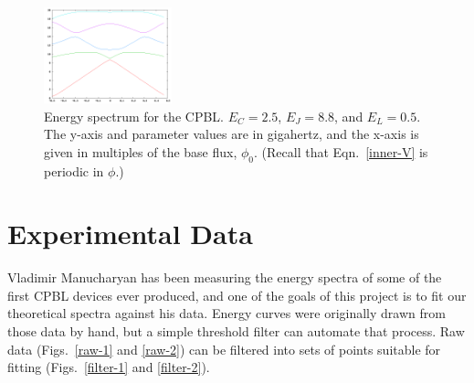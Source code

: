 \documentclass[twocolumn]{revtex4}
\newcommand{\figwidth}{0.33\textwidth}
\begin{document}
\begin{figure} 
\includegraphics[width=\figwidth]{CPBL-theory.png}
\caption{ Energy spectrum for the CPBL. $E_C=2.5$, $E_J=8.8$, and
  $E_L=0.5$. The y-axis and parameter values are in gigahertz, and the
  x-axis is given in multiples of the base flux, $\phi_0$. (Recall
  that Eqn.~\eqref{inner-V} is periodic in $\phi$.)}
\label{cpbl-theory}
\end{figure}

\section{Experimental Data}
Vladimir Manucharyan has been measuring the energy spectra of some of the
first CPBL devices ever produced, and one of the goals of this project
is to fit our theoretical spectra against his data. Energy curves were
originally drawn from those data by hand, but a simple threshold
filter can automate that process. Raw data (Figs.~\ref{raw-1} and
\ref{raw-2}) can be filtered into sets of points suitable for fitting
(Figs.~\ref{filter-1} and \ref{filter-2}).
\end{document}
